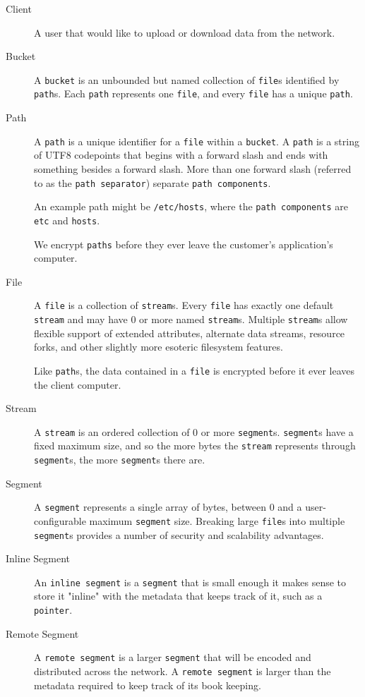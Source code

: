 \documentclass[a4paper,10pt]{article} \usepackage[utf8]{inputenc}
\newcommand{\x}[1]{{\tt #1}} \newcommand{\code}[1]{{\tt #1}}
\begin{document}
\begin{description}
\item[Client] A user that would like to upload or download data from the network. 

\item[Bucket] A \x{bucket} is an unbounded but named
collection of \x{file}s identified by \x{path}s. Each \x{path} represents one
\x{file}, and every \x{file} has a unique \x{path}.

\item[Path] A \x{path} is a unique identifier for a \x{file} within a
\x{bucket}. A \x{path} is a string of UTF8 codepoints that begins with a forward
slash and ends with something besides a forward slash. More than one forward
slash (referred to as the \x{path separator}) separate \x{path components}.

An example path might be \code{/etc/hosts}, where the \x{path components} are
\code{etc} and \code{hosts}.

We encrypt \x{paths} before they ever leave the customer's application's
computer.

\item[File] A \x{file} is a collection of \x{stream}s. Every \x{file} has
exactly one default \x{stream} and may have 0 or more named \x{stream}s.
Multiple \x{stream}s allow flexible support of extended attributes, alternate
data streams, resource forks, and other slightly more esoteric filesystem
features.

Like \x{path}s, the data contained in a \x{file} is encrypted before it ever
leaves the client computer.

\item[Stream] A \x{stream} is an ordered collection of 0 or more \x{segment}s.
\x{segment}s have a fixed maximum size, and so the more bytes the \x{stream}
represents through \x{segment}s, the more \x{segment}s there are.

\item[Segment] A \x{segment} represents a single array of bytes, between 0 and a
user-configurable maximum \x{segment} size. Breaking large \x{file}s into
multiple \x{segment}s provides a number of security and scalability advantages.

\item[Inline Segment] An \x{inline segment} is a \x{segment} that is small
enough it makes sense to store it "inline" with the metadata that keeps track of
it, such as a \x{pointer}.

\item[Remote Segment] A \x{remote segment} is a larger \x{segment} that will be
encoded and distributed across the network. A \x{remote segment} is larger than
the metadata required to keep track of its book keeping.


\end{description}
\end{document}
